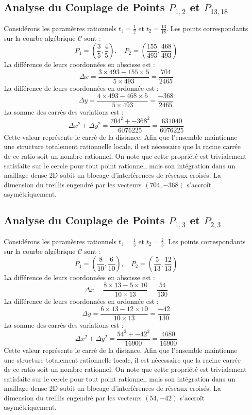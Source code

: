 \documentclass[12pt, a4paper]{article}
\begin{document}
\subsection{Analyse du Couplage de Points $P_{1,2}$ et $P_{13,18}$}
Considérons les paramètres rationnels $t_1 = \frac{1}{2}$ et $t_2 = \frac{13}{18}$.
Les points correspondants sur la courbe algébrique $\mathcal{C}$ sont :
$$ P_1 = \left( \frac{3}{5}, \frac{4}{5} \right), \quad P_2 = \left( \frac{155}{493}, \frac{468}{493} \right) $$
La différence de leurs coordonnées en abscisse est :
$$ \Delta x = \frac{3 \times 493 - 155 \times 5}{5 \times 493} = \frac{704}{2465} $$
La différence de leurs coordonnées en ordonnée est :
$$ \Delta y = \frac{4 \times 493 - 468 \times 5}{5 \times 493} = \frac{-368}{2465} $$
La somme des carrés des variations est :
$$ \Delta x^2 + \Delta y^2 = \frac{ 704^2 + -368^2 }{ 6076225 } = \frac{ 631040 }{ 6076225 } $$
Cette valeur représente le carré de la distance. Afin que l'ensemble maintienne une structure totalement rationnelle locale, il est nécessaire que la racine carrée de ce ratio soit un nombre rationnel. On note que cette propriété est trivialement satisfaite sur le cercle pour tout point rationnel, mais son intégration dans un maillage dense 2D subit un blocage d'interférences de réseaux croisés. La dimension du treillis engendré par les vecteurs $( 704, -368 )$ s'accroît asymétriquement.


\subsection{Analyse du Couplage de Points $P_{1,3}$ et $P_{2,3}$}
Considérons les paramètres rationnels $t_1 = \frac{1}{3}$ et $t_2 = \frac{2}{3}$.
Les points correspondants sur la courbe algébrique $\mathcal{C}$ sont :
$$ P_1 = \left( \frac{8}{10}, \frac{6}{10} \right), \quad P_2 = \left( \frac{5}{13}, \frac{12}{13} \right) $$
La différence de leurs coordonnées en abscisse est :
$$ \Delta x = \frac{8 \times 13 - 5 \times 10}{10 \times 13} = \frac{54}{130} $$
La différence de leurs coordonnées en ordonnée est :
$$ \Delta y = \frac{6 \times 13 - 12 \times 10}{10 \times 13} = \frac{-42}{130} $$
La somme des carrés des variations est :
$$ \Delta x^2 + \Delta y^2 = \frac{ 54^2 + -42^2 }{ 16900 } = \frac{ 4680 }{ 16900 } $$
Cette valeur représente le carré de la distance. Afin que l'ensemble maintienne une structure totalement rationnelle locale, il est nécessaire que la racine carrée de ce ratio soit un nombre rationnel. On note que cette propriété est trivialement satisfaite sur le cercle pour tout point rationnel, mais son intégration dans un maillage dense 2D subit un blocage d'interférences de réseaux croisés. La dimension du treillis engendré par les vecteurs $( 54, -42 )$ s'accroît asymétriquement.
\end{document}

